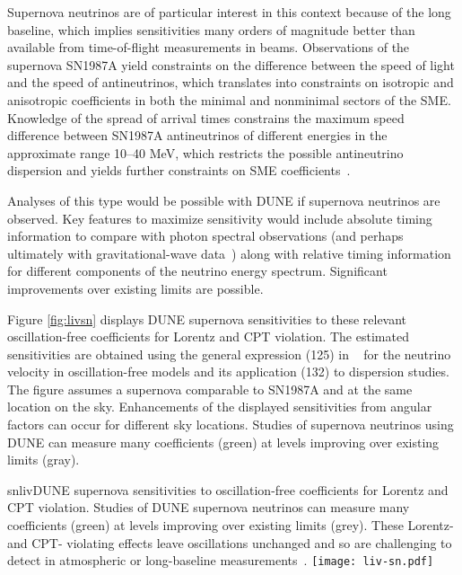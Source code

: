 Supernova neutrinos are of particular interest in this context because of the long baseline, which implies sensitivities many orders of magnitude better than available from time-of-flight measurements in beams. Observations of the supernova SN1987A yield constraints on the difference between the speed of light and the speed of antineutrinos, which translates into constraints on isotropic and anisotropic coefficients in both the minimal and nonminimal sectors of the SME. Knowledge of the spread of arrival times constrains the maximum speed difference between SN1987A antineutrinos of different energies in the approximate range 10--40 MeV, which restricts the possible antineutrino dispersion and yields further constraints on SME coefficients~\cite{Kostelecky:2011gq}.

Analyses of this type would be possible with DUNE if supernova neutrinos are observed. Key features to maximize sensitivity would include absolute timing information to compare with photon spectral observations (and perhaps ultimately with gravitational-wave data~\cite{Kostelecky:2016kfm})  along with relative timing information for different components of the neutrino energy spectrum. Significant improvements over existing limits are possible.

Figure \ref{fig:livsn} displays DUNE supernova sensitivities 
to these relevant oscillation-free coefficients 
for Lorentz and CPT violation.
The estimated sensitivities are obtained using
the general expression (125) in ~\cite{Kostelecky:2011gq}
for the neutrino velocity in oscillation-free models
and its application (132) to dispersion studies.
The figure assumes a supernova comparable to SN1987A
and at the same location on the sky.
Enhancements of the displayed sensitivities 
from angular factors can occur for different sky locations.
Studies of supernova neutrinos using DUNE 
can measure many coefficients (green) 
at levels improving over existing limits (gray).

\begin{dunefigure}{snliv}{DUNE supernova sensitivities to oscillation-free coefficients for Lorentz and CPT violation. Studies of DUNE supernova neutrinos can measure many coefficients (green) at levels improving over existing limits (grey). These Lorentz- and CPT- violating effects leave oscillations unchanged and so are challenging to detect in atmospheric or long-baseline measurements~\cite{kostelecky}.\label{fig:livsn}}
\texttt{[image: liv-sn.pdf]}
\end{dunefigure}

